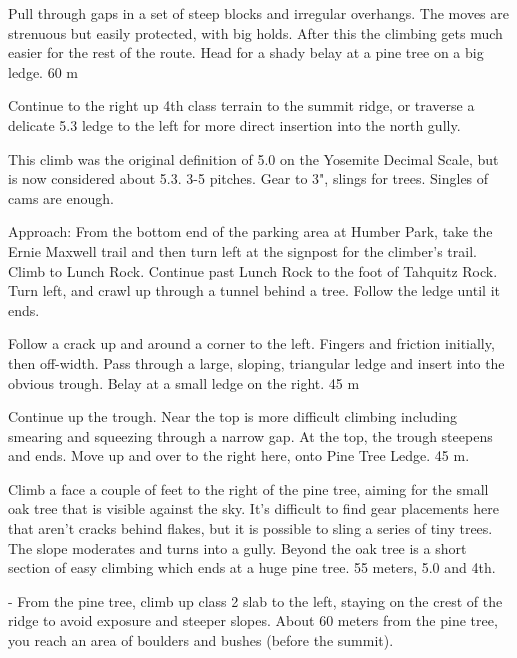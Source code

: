 \documentclass{tahquitz}
\begin{document}
 Pull through gaps in a set of steep blocks and irregular
overhangs. The  moves are strenuous but easily protected, with big
holds. After this the climbing gets much easier for the rest of the
route. Head for a shady belay at a pine tree on a big ledge. 60 m

 Continue to the right up 4th class terrain to the summit ridge,
or traverse a delicate 5.3 ledge to the left for more direct
insertion into the north gully.




This climb was the original definition of 5.0 on the Yosemite Decimal
Scale, but is now considered about 5.3. 3-5 pitches. Gear to 3",
slings for trees. Singles of cams are enough.

Approach: From the bottom end of the parking area at Humber Park,
take the Ernie Maxwell trail and then turn left at the signpost for
the climber's trail. Climb to Lunch Rock. Continue past Lunch Rock to
the foot of Tahquitz Rock. Turn left, and crawl up through a tunnel
behind a tree. Follow the ledge until it ends.

 Follow a crack up and around a corner to the left. Fingers and
friction initially, then off-width. Pass through a large, sloping,
triangular ledge and insert into the obvious trough. Belay at a small
ledge on the right. 45 m

 Continue up the trough. Near the top is more difficult climbing
including smearing and squeezing through a narrow gap. At the top,
the trough steepens and ends. Move up and over to the right here,
onto Pine Tree Ledge. 45 m.

 Climb a face a couple of feet to the right of the pine tree,
aiming for the small oak tree that is visible against the sky. It's
difficult to find gear placements here that aren't cracks behind
flakes, but it is possible to sling a series of tiny trees. The slope
moderates and turns into a gully. Beyond the oak tree is a short
section of easy climbing which ends at a huge pine tree. 55 meters,
5.0 and 4th.

- From the pine tree, climb up class 2 slab to the left, staying on
the crest of the ridge to avoid exposure and steeper slopes. About 60
meters from the pine tree, you reach an area of boulders and bushes
(before the summit).
\end{document}
